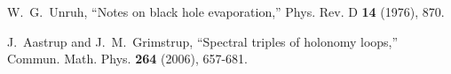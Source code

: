 \documentclass[letterpaper,11pt]{article}
\begin{document}
\begin{thebibliography}{99}
  






W.~G.~Unruh,
``Notes on black hole evaporation,''
Phys. Rev. D \textbf{14} (1976), 870.





J.~Aastrup and J.~M.~Grimstrup,
``Spectral triples of holonomy loops,''
Commun. Math. Phys. \textbf{264} (2006), 657-681.







\end{thebibliography}
\end{document}
